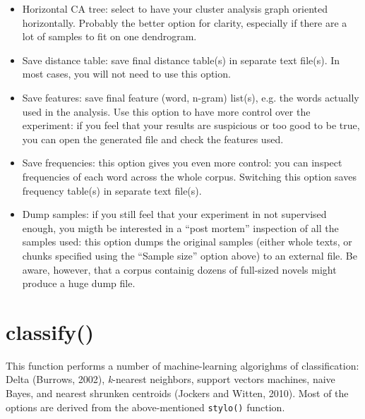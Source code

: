 \documentclass[11pt,a4paper]{article}
\def\margin#1{\marginpar{\textcolor{blue}{\footnotesize\tt #1}}}
\def\code#1{{\tt #1}}
\begin{document}
\begin{itemize}
\item Horizontal CA tree:\margin{dendrogram.lay-\\
out.horizontal=}\margin{TRUE|FALSE} select to have your cluster 
analysis graph oriented horizontally. Probably the better option for 
clarity, especially if there are a lot of samples to fit on one dendrogram. 

\item Save distance table:\margin{save.distan-\\
ce.tables=}\margin{TRUE|FALSE} save final distance table(s) in separate 
text file(s). In most cases, you will not need to use this option. 

\item Save features:\margin{save.analy-\\
zed.features=}\margin{TRUE|FALSE} save final feature (word, n-gram) 
list(s), e.g. the words actually used in the analysis. Use this option 
to have more control over the experiment: if you feel that your results 
are suspicious or too good to be true, you can open the generated file 
and check the features used. 

\item Save frequencies:\margin{save.analyzed.freqs=}\margin{TRUE|FALSE} 
this option gives you even more control: you can inspect frequencies 
of each word across the whole corpus. Switching this option saves 
frequency table(s) in separate text file(s). 

\item Dump samples:\margin{dump.samples=}\margin{TRUE|FALSE} if you
still feel that your experiment in not supervised enough, you migth
be interested in a ``post mortem'' inspection of all the samples used:
this option dumps the original samples (either whole texts, or chunks
specified using the ``Sample size'' option above) to an external file.
Be aware, however, that a corpus containig dozens of full-sized novels
might produce a huge dump file. 
\end{itemize}

\section{classify()}

This function performs a number of machine-learning algorighms of
classification: Delta (Burrows, 2002), \textit{k}-nearest neighbors,
support vectors machines, naive Bayes, and nearest shrunken centroids
(Jockers and Witten, 2010). Most of the options are derived from the
above-mentioned \code{stylo()} function.
\end{document}

